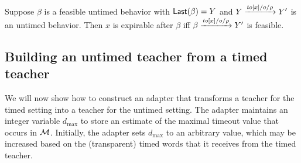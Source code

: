 \begin{lemma}
\label{expirable}
Suppose $\beta$ is a feasible untimed behavior with $\mathsf{Last}({\beta}) = Y$ and $Y \xrightarrow{\mathit{to}[x]/o/\rho} Y'$ is an untimed behavior.
Then $x$ is expirable after $\beta$ iff $\beta \xrightarrow{\mathit{to}[x]/o/\rho} Y'$ is feasible.
\end{lemma}



\subsection{Building an untimed teacher from a timed teacher}
We will now show how to construct an adapter that transforms a teacher for the timed setting into a teacher for the untimed setting.
The adapter maintains an integer variable $d_{\max}$ to store an estimate of the maximal timeout value that occurs in ${\mathcal M}$. Initially, the
adapter sets $d_{\max}$ to an arbitrary value, which may be increased based on the (transparent) timed words that it receives from
the timed teacher.

